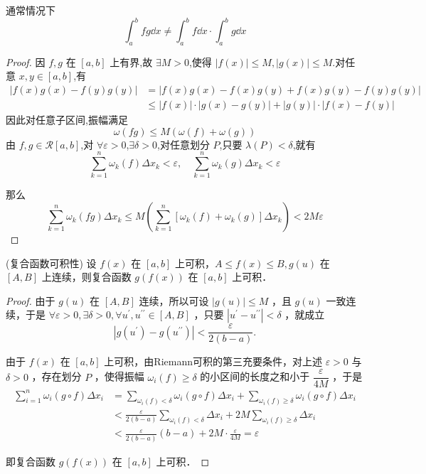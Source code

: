 通常情况下
\[
\int_a^b fg \dd x \neq \int_a^b f \dd x \cdot \int_a^b g \dd x
\]
\begin{proof}
	因 \( f,g \) 在 \( [a,b] \) 上有界,故 \( \exists M > 0 \),使得 \( |f(x)| \leq M, |g(x)| \leq M \).对任意 \( x,y \in [a,b] \),有
	\[
	\begin{aligned}
		|f(x)g(x) - f(y)g(y)|
		&= |f(x)g(x) - f(x)g(y) + f(x)g(y) - f(y)g(y)| \\
		&\leq |f(x)| \cdot |g(x) - g(y)| + |g(y)| \cdot |f(x) - f(y)|
	\end{aligned}
	\]
	因此对任意子区间,振幅满足
	\[
	\omega(fg) \leq M \left( \omega(f) + \omega(g) \right)
	\]
	由 \( f,g \in \mathcal{R}[a,b] \),对 \( \forall \varepsilon>0 \),\( \exists \delta>0 \),对任意划分 \( P \),只要 \( \lambda(P)<\delta \),就有
	\[
	\sum_{k=1}^n \omega_k(f) \Delta x_k < \varepsilon, \quad \sum_{k=1}^n \omega_k(g) \Delta x_k < \varepsilon
	\]
	
	那么
	\[
	\sum_{k=1}^n \omega_k(fg) \Delta x_k \leq M \left( \sum_{k=1}^n \left[ \omega_k(f) + \omega_k(g) \right] \Delta x_k \right) < 2M\varepsilon
	\]
\end{proof}
\begin{proposition}(复合函数可积性)
	设 $f(x)$ 在 $[a, b]$ 上可积，$A \leqslant f(x) \leqslant B, g(u)$ 在 $[A, B]$ 上连续，则复合函数 $g(f(x))$ 在 $[a, b]$ 上可积．
	
\end{proposition}
\begin{proof}
	由于 $g(u)$ 在 $[A, B]$ 连续，所以可设 $|g(u)| \leqslant M$ ，且 $g(u)$ 一致连续，于是 $\forall \varepsilon>0, \exists \delta>0, \forall u^{\prime}, u^{\prime \prime} \in[A, B]$ ，只要 $\left|u^{\prime}-u^{\prime \prime}\right|<\delta$ ，就成立
	$$
	\left|g\left(u^{\prime}\right)-g\left(u^{\prime \prime}\right)\right|<\frac{\varepsilon}{2(b-a)} .
	$$
	
	由于 $f(x)$ 在 $[a, b]$ 上可积，由Riemann可积的第三充要条件，对上述 $\varepsilon>0$ 与 $\delta>0$ ，存在划分 $P$ ，使得振幅 $\omega_i(f) \geqslant \delta$ 的小区间的长度之和小于 $\dfrac{\varepsilon}{4 M}$ ，于是
	$$
	\begin{aligned}
		\sum_{i=1}^n \omega_i(g \circ f) \Delta x_i & =\sum_{\omega_i(f)<\delta} \omega_i(g \circ f) \Delta x_i+\sum_{\omega_i(f)\geqslant\delta} \omega_i(g \circ f) \Delta x_i \\
		& <\frac{\varepsilon}{2(b-a)} \sum_{\omega_i(f)<\delta} \Delta x_i+2 M \sum_{\omega_i(f)\geqslant\delta} \Delta x_i \\
		& <\frac{\varepsilon}{2(b-a)}(b-a)+2 M \cdot \frac{\varepsilon}{4 M}=\varepsilon
	\end{aligned}
	$$
	
	即复合函数 $g(f(x))$ 在 $[a, b]$ 上可积．
\end{proof}
















